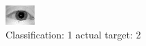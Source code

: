 \begin{figure}[h!]
\begin{center}
\includegraphics[width=0.60\columnwidth]{figures/ID941_class_1_target_2.png}
\end{center}
\caption{ Classification: 1 actual target: 2}
\label{fig:ID941_class_1_target_2}
\end{figure}
